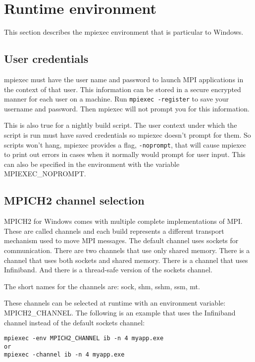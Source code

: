 \documentclass[dvipdfm,11pt]{article}
\begin{document}
\section{Runtime environment}

This section describes the mpiexec environment that is particular to Windows.

\subsection{User credentials}
mpiexec must have the user name and password to launch MPI applications in the context of
that user.  This information can be stored in a secure encrypted manner for each user on a
machine.  Run \texttt{mpiexec -register} to save your username and password.  Then mpiexec
will not prompt you for this information.

This is also true for a nightly build script.  The user context under which the script is 
run must have saved credentials so mpiexec doesn't prompt for them.  So scripts won't hang,
mpiexec provides a flag, \texttt{-noprompt}, that will cause mpiexec to print out errors in 
cases when it normally would prompt for user input.  This can also be specified in the 
environment with the variable MPIEXEC\_NOPROMPT.

\subsection{MPICH2 channel selection}
MPICH2 for Windows comes with multiple complete implementations of MPI.  These are called
channels and each build represents a different transport mechanism used to move MPI messages.
The default channel uses sockets for communication.  There are two channels that use only
shared memory.  There is a channel that uses both sockets and shared memory.  There is a
channel that uses Infiniband.  And there is a thread-safe version of the sockets channel.

The short names for the channels are: sock, shm, sshm, ssm, mt.

These channels can be selected at runtime with an environment variable: MPICH2\_CHANNEL.
The following is an example that uses the Infiniband channel instead of the default sockets
channel:

\begin{verbatim}
mpiexec -env MPICH2_CHANNEL ib -n 4 myapp.exe
or
mpiexec -channel ib -n 4 myapp.exe
\end{verbatim}
\end{document}

